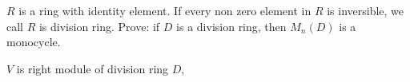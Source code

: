 \documentclass{ctexart}
\newif\ifpreface
\begin{document}
\large
\setlength{\baselineskip}{1.2em}
\ifpreface
    
\else
\maketitle
\fi
{}
\begin{problem}
  \(R\) is a ring with identity element. If every non zero element in \(R\) is inversible, we call \(R\) is division ring.
  Prove: if \( D\) is a division ring, then \(M_n(D)\) is a monocycle.
\end{problem}
\begin{solution}
  
\end{solution}

\begin{problem}
   \(V\) is right module of division ring \(D\), 
\end{problem}
\end{document}
